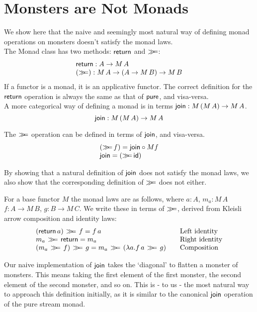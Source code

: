 \section{Monsters are Not Monads}

We show here that the naive and seemingly most natural way of defining monad operations on monsters doesn't satisfy the monad laws. \\

The Monad class has two methods: $\mathsf{return}$ and $\mathbin{\gg\!\!=}$:
$$
\begin{array}{l}
\mathsf{return} : A \rightarrow M\, A \\
(\mathbin{\gg\!\!=}) : M\, A \rightarrow (A \rightarrow M\, B) \rightarrow M\, B
\end{array}
$$
If a functor is a monad, it is an applicative functor. The correct definition for the $\mathsf{return}$ operation is always the same as that of $\mathsf{pure}$, and visa-versa. \\

A more categorical way of defining a monad is in terms $\mathsf{join} : M\,(M\, A) \rightarrow M\, A$.
$$
\mathsf{join} : M\,(M\, A) \rightarrow M\, A
$$

The $\mathbin{\gg\!\!=}$ operation can be defined in terms of $\mathsf{join}$, and visa-versa.
$$
\begin{array}{l}
(\mathbin{\gg\!\!=}\, f) = \mathsf{join} \circ M f \\
\mathsf{join} = (\mathbin{\gg\!\!=}\,\mathsf{id})
\end{array}
$$

By showing that a natural definition of $\mathsf{join}$ does not satisfy the monad laws, we also show that the corresponding definition of $\mathbin{\gg\!\!=}$ does not either.

For a base functor $M$ the monad laws are as follows, where $a:A$, $m_a : M\, A$
$f : A \rightarrow M\, B$, $g : B \rightarrow M\,C$. We write these in terms of $\mathbin{\gg\!\!=}$, derived from Kleisli arrow composition and identity laws:
$$
\begin{array}{l@{\qquad}l}
(\return\, a)\, \bind \, f = f\, a
  & \mbox{Left identity} \\
m_a\, \bind \, \return = m_a
  & \mbox{Right identity} \\
(m_a \, \bind \, f)\, \bind \, g = m_a\, \bind\, (\lambda a.  f\, a \, \bind \, g)
  & \mbox{Composition} \\
\end{array}
$$

Our naive implementation of $\mathsf{join}$ takes the `diagonal' to flatten a monster of monsters. This means taking the first element of the first monster, the second element of the second monster, and so on. This is - to us - the most natural way to approach this definition initially, as it is similar to the canonical $\mathsf{join}$ operation of the pure stream monad. \\


